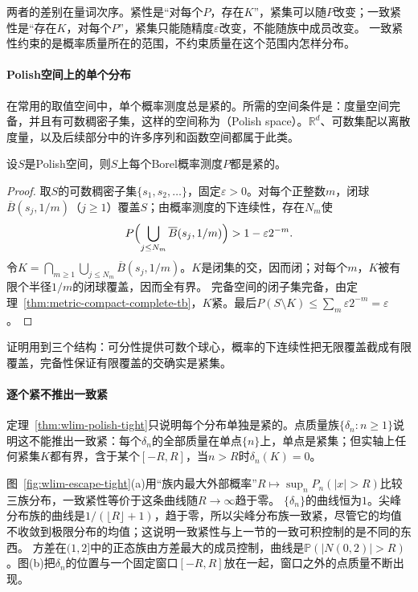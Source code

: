 两者的差别在量词次序。紧性是“对每个$P$，存在$K$”，紧集可以随$P$改变；一致紧性是“存在$K$，对每个$P$”，紧集只能随精度$\varepsilon$改变，不能随族中成员改变。
一致紧性约束的是概率质量所在的范围，不约束质量在这个范围内怎样分布。

\paragraph{Polish空间上的单个分布}
在常用的取值空间中，单个概率测度总是紧的。所需的空间条件是：度量空间完备，并且有可数稠密子集，这样的空间称为（Polish space）。$\mathbb R^d$、可数集配以离散度量，以及后续部分中的许多序列和函数空间都属于此类。

\begin{theorem}[Polish空间上的概率测度是紧的]
\label{thm:wlim-polish-tight}
设$S$是Polish空间，则$S$上每个Borel概率测度$P$都是紧的。
\end{theorem}

\begin{proof}
取$S$的可数稠密子集$\{s_1,s_2,\ldots\}$，固定$\varepsilon>0$。对每个正整数$m$，闭球$\overline B(s_j,1/m)$（$j\geq1$）覆盖$S$；由概率测度的下连续性，存在$N_m$使
\[
  P\Bigl(\bigcup_{j\leq N_m}\overline B(s_j,1/m)\Bigr)>1-\varepsilon2^{-m}.
\]
令$K=\bigcap_{m\geq1}\bigcup_{j\leq N_m}\overline B(s_j,1/m)$。$K$是闭集的交，因而闭；对每个$m$，$K$被有限个半径$1/m$的闭球覆盖，因而全有界。
完备空间的闭子集完备，由定理~\ref{thm:metric-compact-complete-tb}，$K$紧。最后$P(S\setminus K)\leq\sum_m\varepsilon2^{-m}=\varepsilon$。
\end{proof}

证明用到三个结构：可分性提供可数个球心，概率的下连续性把无限覆盖截成有限覆盖，完备性保证有限覆盖的交确实是紧集。

\paragraph{逐个紧不推出一致紧}
定理~\ref{thm:wlim-polish-tight}只说明每个分布单独是紧的。点质量族$\{\delta_n:n\geq1\}$说明这不能推出一致紧：每个$\delta_n$的全部质量在单点$\{n\}$上，单点是紧集；但实轴上任何紧集$K$都有界，含于某个$[-R,R]$，当$n>R$时$\delta_n(K)=0$。

图~\ref{fig:wlim-escape-tight}(a)用“族内最大外部概率”$R\mapsto\sup_nP_n(|x|>R)$比较三族分布，一致紧性等价于这条曲线随$R\to\infty$趋于零。
$\{\delta_n\}$的曲线恒为$1$。尖峰分布族的曲线是$1/(\lfloor R\rfloor+1)$，趋于零，所以尖峰分布族一致紧，尽管它的均值不收敛到极限分布的均值；这说明一致紧性与上一节的一致可积控制的是不同的东西。
方差在$(1,2]$中的正态族由方差最大的成员控制，曲线是$\mathbb P(|N(0,2)|>R)$。图(b)把$\delta_n$的位置与一个固定窗口$[-R,R]$放在一起，窗口之外的点质量不断出现。

